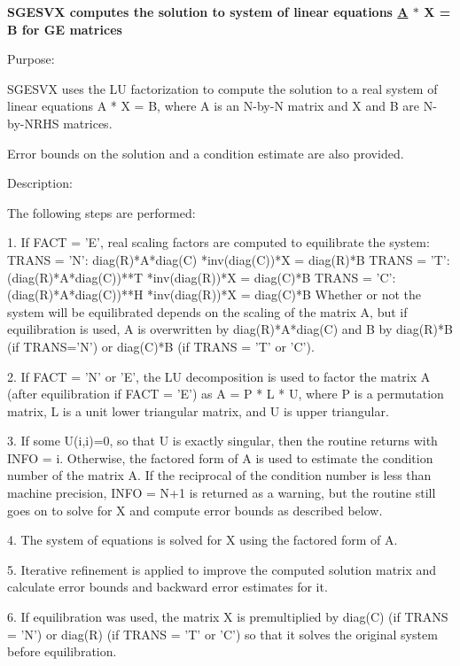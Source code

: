 {\bfseries  S\+G\+E\+S\+V\+X computes the solution to system of linear equations \hyperlink{classA}{A} $\ast$ X = B for G\+E matrices} 

 \begin{DoxyParagraph}{Purpose\+: }
\begin{DoxyVerb} SGESVX uses the LU factorization to compute the solution to a real
 system of linear equations
    A * X = B,
 where A is an N-by-N matrix and X and B are N-by-NRHS matrices.

 Error bounds on the solution and a condition estimate are also
 provided.\end{DoxyVerb}
 
\end{DoxyParagraph}
\begin{DoxyParagraph}{Description\+: }
\begin{DoxyVerb} The following steps are performed:

 1. If FACT = 'E', real scaling factors are computed to equilibrate
    the system:
       TRANS = 'N':  diag(R)*A*diag(C)     *inv(diag(C))*X = diag(R)*B
       TRANS = 'T': (diag(R)*A*diag(C))**T *inv(diag(R))*X = diag(C)*B
       TRANS = 'C': (diag(R)*A*diag(C))**H *inv(diag(R))*X = diag(C)*B
    Whether or not the system will be equilibrated depends on the
    scaling of the matrix A, but if equilibration is used, A is
    overwritten by diag(R)*A*diag(C) and B by diag(R)*B (if TRANS='N')
    or diag(C)*B (if TRANS = 'T' or 'C').

 2. If FACT = 'N' or 'E', the LU decomposition is used to factor the
    matrix A (after equilibration if FACT = 'E') as
       A = P * L * U,
    where P is a permutation matrix, L is a unit lower triangular
    matrix, and U is upper triangular.

 3. If some U(i,i)=0, so that U is exactly singular, then the routine
    returns with INFO = i. Otherwise, the factored form of A is used
    to estimate the condition number of the matrix A.  If the
    reciprocal of the condition number is less than machine precision,
    INFO = N+1 is returned as a warning, but the routine still goes on
    to solve for X and compute error bounds as described below.

 4. The system of equations is solved for X using the factored form
    of A.

 5. Iterative refinement is applied to improve the computed solution
    matrix and calculate error bounds and backward error estimates
    for it.

 6. If equilibration was used, the matrix X is premultiplied by
    diag(C) (if TRANS = 'N') or diag(R) (if TRANS = 'T' or 'C') so
    that it solves the original system before equilibration.\end{DoxyVerb}
 
\end{DoxyParagraph}

